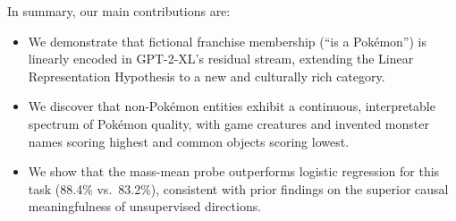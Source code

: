 In summary, our main contributions are:
\begin{itemize}[leftmargin=*,itemsep=0pt,topsep=0pt]
    \item We demonstrate that fictional franchise membership (``is a Pok\'{e}mon'') is linearly encoded in GPT-2-XL's residual stream, extending the Linear Representation Hypothesis to a new and culturally rich category.
    \item We discover that non-Pok\'{e}mon entities exhibit a continuous, interpretable spectrum of Pok\'{e}mon quality, with game creatures and invented monster names scoring highest and common objects scoring lowest.
    \item We show that the mass-mean probe outperforms logistic regression for this task (88.4\% vs.\ 83.2\%), consistent with prior findings on the superior causal meaningfulness of unsupervised directions.
\end{itemize}
